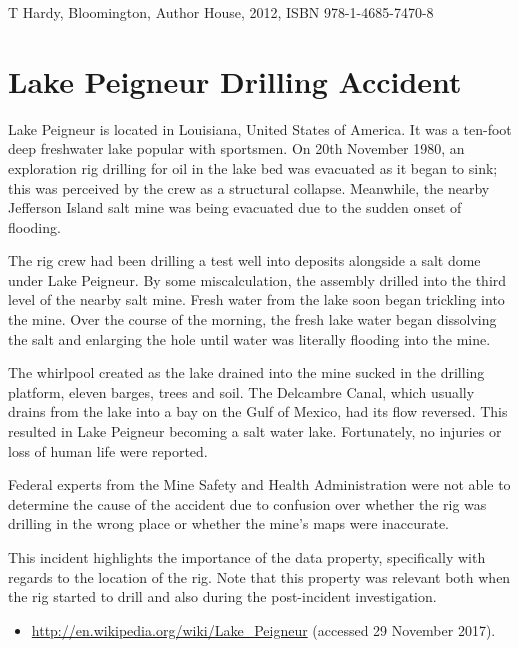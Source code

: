 T Hardy,  Bloomington, Author House, 2012, ISBN 978-1-4685-7470-8

\section{Lake Peigneur Drilling Accident} \label{bkm:incacc:peigneur}
Lake Peigneur is located in Louisiana, United States of America. It was a ten-foot deep freshwater lake popular with sportsmen. On 20th November 1980, an exploration rig drilling for oil in the lake bed was evacuated as it began to sink; this was perceived by the crew as a structural collapse. Meanwhile, the nearby Jefferson Island salt mine was being evacuated due to the sudden onset of flooding. 

The rig crew had been drilling a test well into deposits alongside a salt dome under Lake Peigneur. By some miscalculation, the assembly drilled into the third level of the nearby salt mine. Fresh water from the lake soon began trickling into the mine. Over the course of the morning, the fresh lake water began dissolving the salt and enlarging the hole until water was literally flooding into the mine.

The whirlpool created as the lake drained into the mine sucked in the drilling platform, eleven barges, trees and soil. The Delcambre Canal, which usually drains from the lake into a bay on the Gulf of Mexico, had its flow reversed. This resulted in Lake Peigneur becoming a salt water lake. Fortunately, no injuries or loss of human life were reported. 

Federal experts from the Mine Safety and Health Administration were not able to determine the cause of the accident due to confusion over whether the rig was drilling in the wrong place or whether the mine's maps were inaccurate.

This incident highlights the importance of the  \gls{data property}, specifically with regards to the location of the rig. Note that this property was relevant both when the rig started to drill and also during the post-incident investigation.

\begin{samepage}
\begin{itemize}
  \item \raggedright{\href{http://en.wikipedia.org/wiki/Lake_Peigneur}{http://en.wikipedia.org/wiki/Lake\_Peigneur} (accessed 29 November 2017).}
\end{itemize}
\end{samepage}


